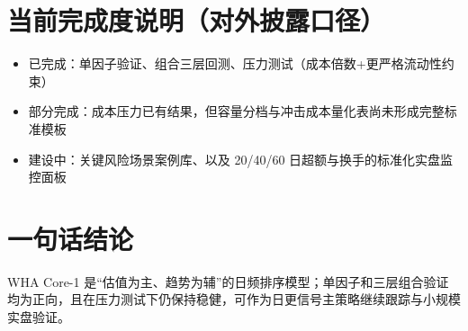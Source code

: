 \documentclass[12pt,a4paper,fontset=fandol]{ctexart}
\begin{document}
\section{当前完成度说明（对外披露口径）}
\begin{itemize}
  \item 已完成：单因子验证、组合三层回测、压力测试（成本倍数+更严格流动性约束）
  \item 部分完成：成本压力已有结果，但容量分档与冲击成本量化表尚未形成完整标准模板
  \item 建设中：关键风险场景案例库、以及 20/40/60 日超额与换手的标准化实盘监控面板
\end{itemize}

\section{一句话结论}
WHA Core-1 是“估值为主、趋势为辅”的日频排序模型；单因子和三层组合验证均为正向，且在压力测试下仍保持稳健，可作为日更信号主策略继续跟踪与小规模实盘验证。
\end{document}
